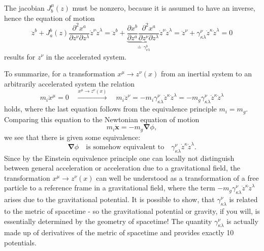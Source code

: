\documentclass[a4paper,11pt]{article}
\numberwithin{equation}{section}
\newcommand\vect[1]{\ensuremath{\bm{#1}}}
\begin{document}
{\begin{align}
\begin{aligned}
\end{aligned} \end{align} The jacobian $J^\mu_{b}(z)$ must be nonzero, because it is assumed to have an inverse, hence the equation of motion \begin{equation}
\ddot{z}^b + J_a^{b}(z)\frac{\partial^2 x^a}{\partial z^\nu \partial z^\lambda}\dot{z}^\nu \dot{z}^\lambda  = \ddot{z}^b + \underbrace{\frac{\partial x^b}{\partial z^a}\frac{\partial^2 x^a}{\partial z^\nu \partial z^\lambda}}_{\doteq \, \gamma^b_{\nu \lambda}}\dot{z}^\nu \dot{z}^\lambda = \ddot{z}^\nu + \gamma^\nu_{\kappa \lambda} \dot{z}^\kappa \dot{z}^\lambda = 0
\end{equation} results for $z^\nu$ in the accelerated system.

To summarize, for a transformation $x^\mu \rightarrow z^\nu(x)$ from an inertial system to an arbitrarily accelerated system the relation \begin{equation}
m_i\ddot{x}^\mu = 0 \quad  \xrightarrow{x^\mu \rightarrow z^\nu(x)} \quad m_i\ddot{z}^\nu = -m_i\gamma^\nu_{\kappa\lambda}\dot{z}^\kappa \dot{z}^\lambda = -m_g\gamma^\nu_{\kappa\lambda}\dot{z}^\kappa \dot{z}^\lambda
\end{equation} holds, where the last equation follows from the equivalence principle $m_i = m_g$. Comparing this equation to the Newtonian equation of motion \begin{equation}
m_i \ddot{\vect{x}} = -m_g\vect{\nabla}\phi,
\end{equation} we see that there is given some equivalence: \begin{equation}
\vect{\nabla}\phi \quad \text{is somehow equivalent to} \quad \gamma^\nu_{\kappa\lambda}\dot{z}^\kappa \dot{z}^\lambda.
\end{equation} Since by the Einstein equivalence principle one can locally not distinguish between general acceleration or acceleration due to a gravitational field, the transformation $x^\mu \rightarrow z^\nu(x)$ can well be understood as a transformation of a free particle to a reference frame in a gravitational field, where the term $-m_g\gamma^\nu_{\kappa\lambda}\dot{z}^\kappa \dot{z}^\lambda$ arises due to the gravitational potential. It is possible to show, that $\gamma^\nu_{\kappa \lambda}$ is related to the metric of spacetime - so the gravitational potential or gravity, if you will, is essentially determined by the geometry of spacetime! The quantity $\gamma^\nu_{\kappa \lambda}$ is actually made up of derivatives of the metric of spacetime and provides exactly 10 \flqq potentials\frqq.\

}
\end{document}
